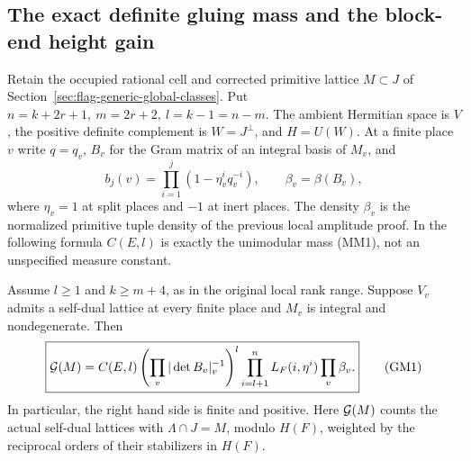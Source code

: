 \subsection{The exact definite gluing mass and the block-end height gain}
\label{sec:flag-generic-gluing-mass}

Retain the occupied rational cell and corrected primitive lattice
\(M\subset J\) of Section~\ref{sec:flag-generic-global-classes}.
Put \(n=k+2r+1,\ m=2r+2,\ l=k-1=n-m\).
The ambient Hermitian space is \(V\), the positive definite
complement is \(W=J^\perp\), and \(H=U(W)\).
At a finite place \(v\) write \(q=q_v\), \(B_v\) for the Gram
matrix of an integral basis of \(M_v\), and
\[
 b_j(v)=\prod_{i=1}^j(1-\eta_v^i q_v^{-i}),\qquad
 \beta_v=\beta(B_v),
\]
where \(\eta_v=1\) at split places and \(-1\) at inert places.
The density \(\beta_v\) is the normalized primitive tuple density
of the previous local amplitude proof.  In the following formula
\(C(E,l)\) is exactly the unimodular mass (MM1), not an
unspecified measure constant.

\begin{theorem}
\label{thm:flag-generic-gluing-mass}
Assume \(l\ge1\) and \(k\ge m+4\), as in the original local rank range.
Suppose \(V_v\) admits a self-dual lattice at every finite place
and \(M_v\) is integral and nondegenerate.
Then
\[
 \boxed{\displaystyle
 {\cal G}(M)=C(E,l)
       \left(\prod_v|\det B_v|_v^{-1}\right)^l
       \prod_{i=l+1}^{n} L_F(i,\eta^i)\prod_v\beta_v .}
 \tag{GM1}
\]
In particular, the right hand side is finite and positive.
Here \({\cal G}(M)\) counts the actual self-dual lattices
with \(\Lambda\cap J=M\), modulo \(H(F)\), weighted by the
reciprocal orders of their stabilizers in \(H(F)\).
\end{theorem}

